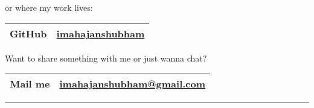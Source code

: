 \documentclass[11pt]{article}
\begin{document}
or where my work lives:

\begin{center}
\begin{tabular}{ll}
\hline
\textbf{GitHub} & \href{https://github.com/imahajanshubham}{imahajanshubham}\\
\hline
\end{tabular}
\end{center}

Want to share something with me or just wanna chat?

\begin{center}
\begin{tabular}{ll}
\hline
\textbf{Mail me} & \href{mailto:imahajanshubham@gmail.com?}{imahajanshubham@gmail.com}\\
\hline
\end{tabular}
\end{center}

\noindent\rule{\textwidth}{0.5pt}
\end{document}
